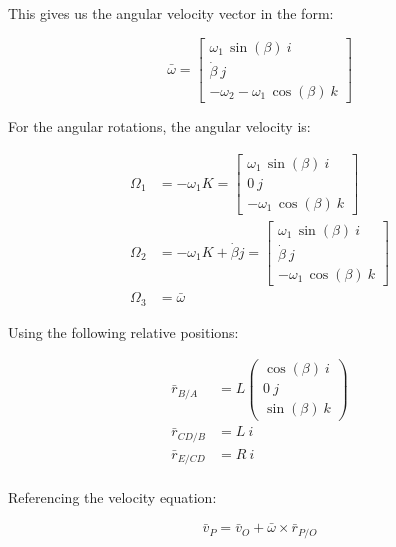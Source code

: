\documentclass[12pt, letterpaper]{../assignment}
\begin{document}
This gives us the angular velocity vector in the form:

$$ \bar{\omega} = \left[\begin{array}{r} \omega _{1}\,\sin\left(\beta \right) \ i \\ \dot{\beta } \ j \\ -\omega _{2}-\omega _{1}\,\cos\left(\beta \right) \ k  \end{array}\right] $$

For the angular rotations, the angular velocity is:

\begin{equation*}
\begin{aligned}
\Omega_1 &= -\omega_1 K= \left[\begin{array}{r} \omega _{1}\,\sin\left(\beta \right) \ i \\ 0 \ j \\ -\omega _{1}\,\cos\left(\beta \right) \ k  \end{array}\right]\\
\Omega_2 &= -\omega_1 K+ \dot{\beta} j = \left[\begin{array}{r} \omega _{1}\,\sin\left(\beta \right) \ i \\ \dot{\beta } \ j \\ -\omega _{1}\,\cos\left(\beta \right) \ k  \end{array}\right]\\
\Omega_3 &= \bar{\omega}
\end{aligned}
\end{equation*}

Using the following relative positions:

\begin{equation*}
    \begin{aligned}
        \bar{r}_{B/A} &= L\left(\begin{array}{c} \cos\left(\beta \right)\ i\\ 0 \ j\\ \sin\left(\beta \right) \ k \end{array}\right)\\
        \bar{r}_{CD/B} &= L\ i\\
        \bar{r}_{E/CD} &= R\ i\\
    \end{aligned}
\end{equation*}

Referencing the velocity equation:

$$ \bar{v}_P = \bar{v}_O + \bar{\omega} \times \bar{r}_{P/O}$$
    
\end{document}
